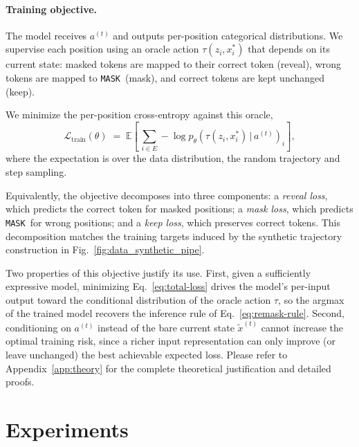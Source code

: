 \documentclass{llmxive}
\providecommand{\xstar}{x^{\ast}}
\providecommand{\mask}{\texttt{MASK}}
\providecommand{\Ltrain}{\mathcal{L}_{\mathrm{train}}}
\begin{document}
\paragraph{Training objective.}
The model receives $a^{(t)}$ and outputs per-position categorical distributions. We supervise each position using an oracle action $\tau(z_i, \xstar_i)$ that depends on its current state: masked tokens are mapped to their correct token (reveal), wrong tokens are mapped to \mask\ (mask), and correct tokens are kept unchanged (keep).

We minimize the per-position cross-entropy against this oracle,
\begin{equation}
\Ltrain(\theta) \;=\; \mathbb{E}\!\left[\,\sum_{i \in E} -\log p_\theta\!\left(\tau(z_i, \xstar_i) \,\big|\, a^{(t)}\right)_i\right],
\label{eq:total-loss}
\end{equation}
where the expectation is over the data distribution, the random trajectory and step sampling.

Equivalently, the objective decomposes into three components:
a \textit{reveal loss}, which predicts the correct token for masked positions;
a \textit{mask loss}, which predicts \mask\ for wrong positions;
and a \textit{keep loss}, which preserves correct tokens.
This decomposition matches the training targets induced by the synthetic trajectory construction in Fig.~\ref{fig:data_synthetic_pipe}.

Two properties of this objective justify its use. First, given a sufficiently expressive model, minimizing Eq.~\eqref{eq:total-loss} drives the model's per-input output toward the conditional distribution of the oracle action $\tau$, so the argmax of the trained model recovers the inference rule of Eq.~\eqref{eq:remask-rule}. Second, conditioning on $a^{(t)}$ instead of the bare current state $\tilde{x}^{(t)}$ cannot increase the optimal training risk, since a richer input representation can only improve (or leave unchanged) the best achievable expected loss. Please refer to Appendix~\ref{app:theory} for the complete theoretical justification and detailed proofs.


\section{Experiments}
\label{sec:experiments}
\end{document}
